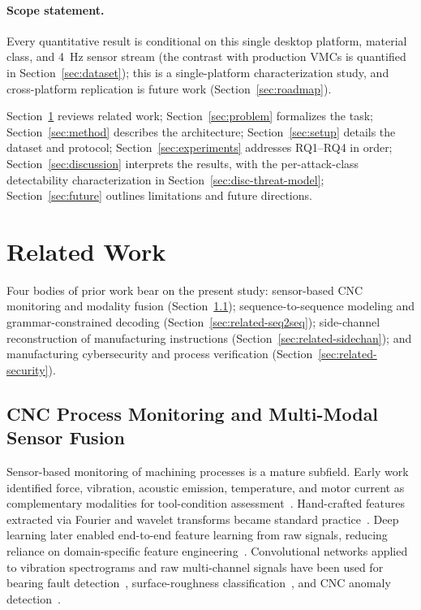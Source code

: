 \documentclass[sensors,article,submit,moreauthors,pdftex]{Definitions/mdpi}
\begin{document}
\paragraph{Scope statement.} Every quantitative result is conditional on this single desktop platform, material class, and 4~Hz sensor stream (the contrast with production VMCs is quantified in Section~\ref{sec:dataset}); this is a single-platform characterization study, and cross-platform replication is future work (Section~\ref{sec:roadmap}).

Section~\ref{sec:related} reviews related work; Section~\ref{sec:problem} formalizes the task; Section~\ref{sec:method} describes the architecture; Section~\ref{sec:setup} details the dataset and protocol; Section~\ref{sec:experiments} addresses RQ1--RQ4 in order; Section~\ref{sec:discussion} interprets the results, with the per-attack-class detectability characterization in Section~\ref{sec:disc-threat-model}; Section~\ref{sec:future} outlines limitations and future directions.

\section{Related Work}
\label{sec:related}

Four bodies of prior work bear on the present study: sensor-based CNC monitoring and modality fusion (Section~\ref{sec:related-cnc}); sequence-to-sequence modeling and grammar-constrained decoding (Section~\ref{sec:related-seq2seq}); side-channel reconstruction of manufacturing instructions (Section~\ref{sec:related-sidechan}); and manufacturing cybersecurity and process verification (Section~\ref{sec:related-security}).

\subsection{CNC Process Monitoring and Multi-Modal Sensor Fusion}
\label{sec:related-cnc}

Sensor-based monitoring of machining processes is a mature subfield. Early work identified force, vibration, acoustic emission, temperature, and motor current as complementary modalities for tool-condition assessment~\cite{teti2010advanced}. Hand-crafted features extracted via Fourier and wavelet transforms became standard practice~\cite{zhu2009wavelet,mohanraj2020tool}. Deep learning later enabled end-to-end feature learning from raw signals, reducing reliance on domain-specific feature engineering~\cite{wang2018deep,zhao2019machine}. Convolutional networks applied to vibration spectrograms and raw multi-channel signals have been used for bearing fault detection~\cite{janssens2016convolutional}, surface-roughness classification~\cite{bhandari2021comparative,stathatos2024cnn}, and CNC anomaly detection~\cite{coelho2024anomaly}.
\end{document}
